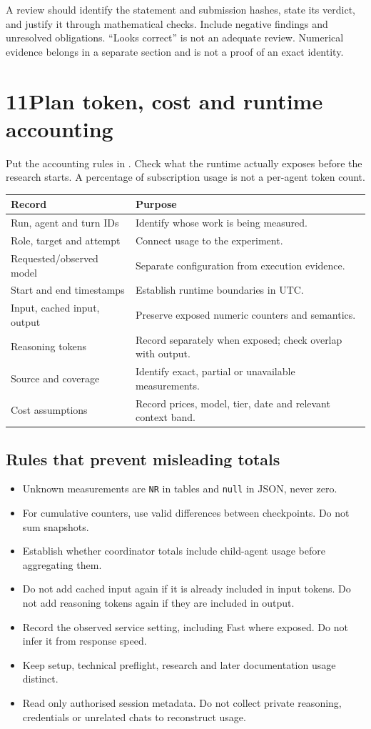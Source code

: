\documentclass[11pt,a4paper]{article}
\newcommand{\pathcode}[1]{\texttt{\small\detokenize{#1}}}
\newcommand{\step}[2]{\section*{#1\quad #2}}
\begin{document}
A review should identify the statement and submission hashes, state its verdict, and justify it through mathematical checks. Include negative findings and unresolved obligations. ``Looks correct'' is not an adequate review. Numerical evidence belongs in a separate section and is not a proof of an exact identity.
\newpage

\step{11}{Plan token, cost and runtime accounting}
Put the accounting rules in \pathcode{instructions/accounting.md}. Check what the runtime actually exposes before the research starts. A percentage of subscription usage is not a per-agent token count.

\begin{tabularx}{\linewidth}{@{}p{47mm}Y@{}}
\toprule
\textbf{Record} & \textbf{Purpose}\\
\midrule
Run, agent and turn IDs & Identify whose work is being measured.\\
Role, target and attempt & Connect usage to the experiment.\\
Requested/observed model & Separate configuration from execution evidence.\\
Start and end timestamps & Establish runtime boundaries in UTC.\\
Input, cached input, output & Preserve exposed numeric counters and semantics.\\
Reasoning tokens & Record separately when exposed; check overlap with output.\\
Source and coverage & Identify exact, partial or unavailable measurements.\\
Cost assumptions & Record prices, model, tier, date and relevant context band.\\
\bottomrule
\end{tabularx}

\subsection*{Rules that prevent misleading totals}
\begin{itemize}
\item Unknown measurements are \texttt{NR} in tables and \texttt{null} in JSON, never zero.
\item For cumulative counters, use valid differences between checkpoints. Do not sum snapshots.
\item Establish whether coordinator totals include child-agent usage before aggregating them.
\item Do not add cached input again if it is already included in input tokens. Do not add reasoning tokens again if they are included in output.
\item Record the observed service setting, including Fast where exposed. Do not infer it from response speed.
\item Keep setup, technical preflight, research and later documentation usage distinct.
\item Read only authorised session metadata. Do not collect private reasoning, credentials or unrelated chats to reconstruct usage.
\end{itemize}
\end{document}
